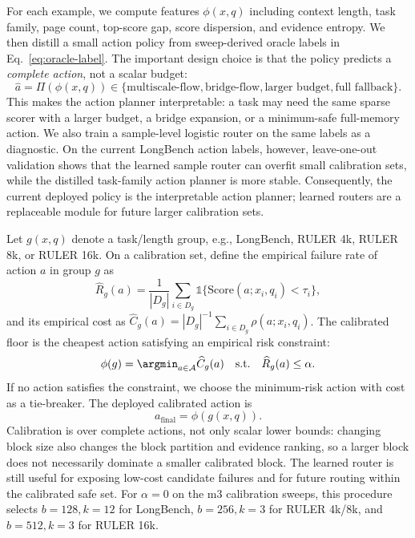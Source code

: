 \documentclass{article}
\newcommand{\action}{\mathcal{A}}
\newcommand{\Score}{\mathrm{Score}}
\begin{document}
For each example, we compute features $\phi(x,q)$ including context length, task family, page count, top-score gap, score dispersion, and evidence entropy.
We then distill a small action policy from sweep-derived oracle labels in Eq.~\ref{eq:oracle-label}.
The important design choice is that the policy predicts a \emph{complete action}, not a scalar budget:
\begin{equation}
    \hat{a}
    =
    \Pi(\phi(x,q))
    \in
    \{ \text{multiscale-flow}, \text{bridge-flow}, \text{larger budget}, \text{full fallback}\}.
\end{equation}
This makes the action planner interpretable: a task may need the same sparse scorer with a larger budget, a bridge expansion, or a minimum-safe full-memory action.
We also train a sample-level logistic router on the same labels as a diagnostic.
On the current LongBench action labels, however, leave-one-out validation shows that the learned sample router can overfit small calibration sets, while the distilled task-family action planner is more stable.
Consequently, the current deployed policy is the interpretable action planner; learned routers are a replaceable module for future larger calibration sets.

Let $g(x,q)$ denote a task/length group, e.g., LongBench, RULER 4k, RULER 8k, or RULER 16k.
On a calibration set, define the empirical failure rate of action $a$ in group $g$ as
\begin{equation}
    \widehat{R}_g(a)
    =
    \frac{1}{|D_g|}
    \sum_{i \in D_g}
    \mathbb{1}\{\Score(a;x_i,q_i) < \tau_i\},
\end{equation}
and its empirical cost as $\widehat{C}_g(a)=|D_g|^{-1}\sum_{i\in D_g}\rho(a;x_i,q_i)$.
The calibrated floor is the cheapest action satisfying an empirical risk constraint:
\begin{equation}
    \phi(g)
    =
    \argmin_{a\in\action} \widehat{C}_g(a)
    \quad
    \text{s.t.}
    \quad
    \widehat{R}_g(a) \leq \alpha.
    \label{eq:calibrated-floor}
\end{equation}
If no action satisfies the constraint, we choose the minimum-risk action with cost as a tie-breaker.
The deployed calibrated action is
\begin{equation}
    a_{\mathrm{final}}
    =
    \phi(g(x,q)).
\end{equation}
Calibration is over complete actions, not only scalar lower bounds: changing block size also changes the block partition and evidence ranking, so a larger block does not necessarily dominate a smaller calibrated block.
The learned router is still useful for exposing low-cost candidate failures and for future routing within the calibrated safe set.
For $\alpha=0$ on the m3 calibration sweeps, this procedure selects $b=128,k=12$ for LongBench, $b=256,k=3$ for RULER 4k/8k, and $b=512,k=3$ for RULER 16k.
\end{document}
